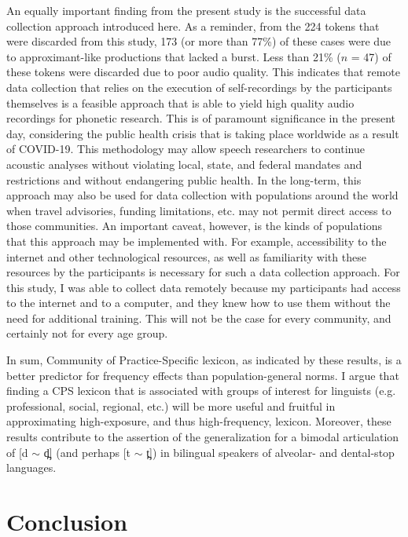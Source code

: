 \documentclass[output=paper,colorlinks,citecolor=brown,
]{langscibook}
\begin{document}
An equally important finding from the present study is the successful data collection approach introduced here. As a reminder, from the 224 tokens that were discarded from this study, 173 (or more than 77\%) of these cases were due to approximant-like productions that lacked a burst. Less than 21\% ($n$ = 47) of these tokens were discarded due to poor audio quality. This indicates that remote data collection that relies on the execution of self-recordings by the participants themselves is a feasible approach that is able to yield high quality audio recordings for phonetic research. This is of paramount significance in the present day, considering the public health crisis that is taking place worldwide as a result of COVID-19. This methodology may allow speech researchers to continue acoustic analyses without violating local, state, and federal mandates and restrictions and without endangering public health. In the long-term, this approach may also be used for data collection with populations around the world when travel advisories, funding limitations, etc. may not permit direct access to those communities. An important caveat, however, is the kinds of populations that this approach may be implemented with. For example, accessibility to the internet and other technological resources, as well as familiarity with these resources by the participants is necessary for such a data collection approach. For this study, I was able to collect data remotely because my participants had access to the internet and to a computer, and they knew how to use them without the need for additional training. This will not be the case for every community, and certainly not for every age group.

In sum, Community of Practice-Specific lexicon, as indicated by these results, is a better predictor for frequency effects than population-general norms. I argue that finding a CPS lexicon that is associated with groups of interest for linguists (e.g. professional, social, regional, etc.) will be more useful and fruitful in approximating high-exposure, and thus high-frequency, lexicon. Moreover, these results contribute to the assertion of the generalization for a bimodal articulation of [d $\sim$ d̪] (and perhaps [t $\sim$ t̪]) in bilingual speakers of alveolar- and dental-stop languages.

\section{Conclusion}\label{sec:gutierrez:conclusion}
\end{document}
